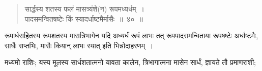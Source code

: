 \documentclass[10pt, openany]{book}
\begin{document}
{{

\vspace{0.4cm}{उदाहरणम्\textemdash}

\begin{quote}
    
{\eg सार्द्धस्य शतस्य फलं मासत्र्यंशे(न) रूपमध्यर्धम्~। \\
 पादसमन्वितषष्टेः किं स्यादर्धाष्टमैर्मासैः~॥~४०~॥}\end{quote}

{रूपार्धसहितस्य रूपशतस्य मासत्रिभागेन यदि अध्यर्धं रूपं लाभः तत्
रूपपादसमन्विताया रूपषष्टेः अर्धाष्टमैः, सार्धैः सप्तभिः, मासैः कियान् लाभः स्यात्
इति भिन्नोदाहरणम्~।}

{मध्यमो राशिः; यस्य मूलस्य सार्धशतात्मनो यावता कालेन, त्रिभागात्मना
मासेन सार्धं, ज्ञायते तौ प्रमाणराशी;}

}}
\end{document}
